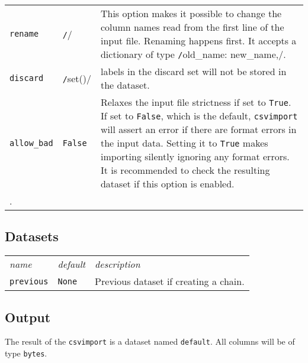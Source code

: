 \begin{tabular}{ p{3.2cm} p{1.8cm} p{10cm}}
  \texttt{rename} & \texttt/{}/ & This option makes it possible to
  change the column names read from the first line of the input file.
  Renaming happens first.  It accepts a dictionary of type
  \texttt/{old_name: new_name,}/.\\[1ex]

  \texttt{discard} & \texttt/set()/ & labels in the discard set will
  not be stored in the dataset.\\[1ex]
  
  \texttt{allow\_bad} & \texttt{False} & Relaxes the input file
  strictness if set to \texttt{True}.  If set to \texttt{False}, which
  is the default, \texttt{csvimport} will assert an error if there are
  format errors in the input data.  Setting it to \texttt{True} makes
  importing silently ignoring any format errors.  It is recommended to
  check the resulting dataset if this option is enabled.\\[1ex].
\end{tabular}


\subsection{Datasets}
\begin{tabular}{ p{3.2cm} p{1.8cm} p{10cm}}
  \textsl{name} & \textsl{default} & \textsl{description}\\[2ex]
  \texttt{previous} & \texttt{None} & Previous dataset if creating a
  chain.
\end{tabular}

\subsection{Output}
The result of the \texttt{csvimport} is a dataset named
\texttt{default}.  All columns will be of type \texttt{bytes}.







